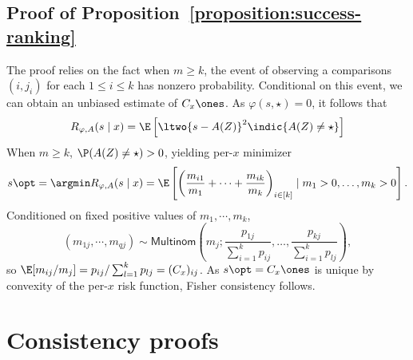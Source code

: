 \documentclass[11pt]{article}
\newcommand{\prn}[1]{\left({#1}\right)} %
\newcommand{\brk}[1]{\left[{#1}\right]} %
\newcommand{\multinom}{\mathsf{Multinom}}  %
\newcommand{\sloss}{\varphi}  %
\begin{document}
\subsection{Proof of Proposition~\ref{proposition:success-ranking}}
\label{sec:proof-success-ranking}

The proof relies on the fact when $m \geq k$, the event of observing
a comparisons $(i,j_i)$ for each $1 \leq i \leq k$ has nonzero probability.
%
Conditional on this event, we can obtain an
unbiased estimate of $C_x \ones$.
%
As $\sloss(s, \star) = 0$, it follows that
\begin{align*}
  R_{\sloss, A}(s\mid x) = \E \brk{\ltwo{s - A(Z)}^2
    \indic{A(Z) \neq \star}}
\end{align*}
When $m \geq k$, $\P(A(Z) \neq \star) > 0$, yielding per-$x$ minimizer
\begin{equation*}
  s\opt = \argmin R_{\sloss,A}(s \mid x)
  = \E\left[\left(\frac{m_{i1}}{m_1} + \cdots + \frac{m_{ik}}{m_k}
    \right)_{i \in [k]} \mid m_1 > 0, \ldots, m_k > 0 \right].
\end{equation*}
Conditioned on fixed positive values of $m_1, \cdots, m_k$,
\begin{equation*}
  (m_{1j}, \cdots, m_{qj}) \sim \multinom
  \left(m_j; \frac{p_{1j}}{\sum_{i=1}^k p_{ij}}, \ldots,
  \frac{p_{kj}}{\sum_{i=1}^k p_{lj}}\right),
\end{equation*}
so $\E[m_{ij}/m_j] = p_{ij}/\sum_{l=1}^k p_{lj} = (C_x)_{ij}$.
%
As $s\opt = C_x \ones$ is unique by convexity of the per-$x$ risk function, Fisher consistency follows.


\section{Consistency proofs}
\end{document}
